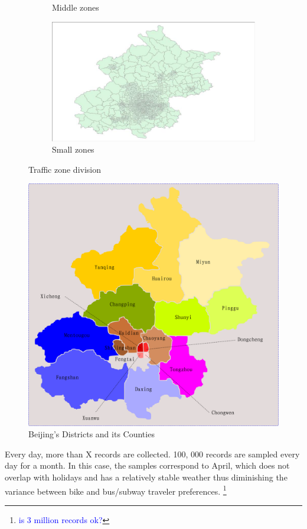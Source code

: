 \documentclass{article}
\newcommand{\technicalDoubt}[1]{\footnote{\textcolor{blue}{#1}}}
\begin{document}
\begin{figure}[H]
\begin{subfigure}[b]{.3\textwidth}
  	\caption{Middle zones}
  \end{subfigure}
  \begin{subfigure}[b]{.3\textwidth}
  	\centering
  	\includegraphics[width=\linewidth]{./images/small_traffic_zone.jpg}
  	\caption{Small zones}
  \end{subfigure}
  \caption{Traffic zone division}
  	\label{fig:data/traffic_zones}
\end{figure}

\begin{figure}
  \centering
  \includegraphics[width=.8\linewidth]{./images/beijing_18areas.png}
  \caption{Beijing's Districts and its Counties}
  \label{fig:data/18areas}
\end{figure}

Every day, more than X records are collected. 100, 000 records are sampled every day for a month. In this case, the samples correspond to April, which does not overlap with holidays and has a relatively stable weather thus diminishing the variance between bike and bus/subway traveler preferences.  \technicalDoubt{is 3 million records ok?}
\end{document}
